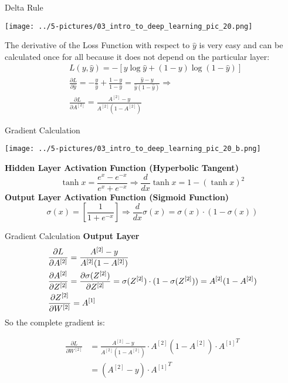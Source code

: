 \documentclass[11pt]{beamer}
\begin{document}
\begin{frame}{Delta Rule}
\begin{center}
\texttt{[image: ../5-pictures/03\_intro\_to\_deep\_learning\_pic\_20.png]} 
\end{center}
The derivative of the Loss Function with respect to $\hat y$ is very easy and can be calculated once for all because it does not depend on the particular layer:
\begin{align*}
&L(y, \hat{y}) = -[y\log{\hat{y}} + (1 - y)\log{(1 - \hat{y})}] \\
&\frac{\partial L}{\partial \hat y} = -\frac{y}{\hat y} + \frac{1-y}{1-\hat y} = \frac{\hat y - y}{\hat y(1 - \hat y)} \Rightarrow \\
&\frac{\partial L}{\partial A^{[2]}} = \frac{A^{[2]} - y}{A^{[2]}(1 - A^{[2]})}
\end{align*}
\end{frame}
\begin{frame}{Gradient Calculation}
\begin{center}
\texttt{[image: ../5-pictures/03\_intro\_to\_deep\_learning\_pic\_20\_b.png]} 
\end{center}
\textbf{Hidden Layer Activation Function (Hyperbolic Tangent)}
\begin{equation}
\tanh x = \frac{{{e^x} -{e^{- x}}}}{{{e^x} + {e^{ -x}}}} 
\Rightarrow 
\frac{d}{{dx}}\tanh x =  1-{\left(\tanh x \right)}^2 
\end{equation}
\textbf{Output Layer Activation Function (Sigmoid Function)} 
\begin{equation}
\sigma(x) =  \left[ \dfrac{1}{1 + e^{-x}} \right]  \Rightarrow
\dfrac{d}{dx} \sigma(x) =  \sigma(x) \cdot (1 - \sigma(x))
\end{equation}
\end{frame}
\begin{frame}{Gradient Calculation}
\textbf{Output Layer}
\begin{align*}
& \frac{\partial L}{\partial A^{[2]}} = \frac{A^{[2]} - y}{A^{[2]}(1 - A^{[2]})} \notag\\
& \frac{\partial A^{[2]}}{\partial Z^{[2]}} = \frac{\partial \sigma(Z^{[2]})}{\partial Z^{[2]}} = \sigma(Z^{[2]}) \cdot (1 - \sigma(Z^{[2]})) 
= A^{[2]} (1 - A^{[2]}) \\
& \frac{\partial Z^{[2]}}{\partial W^{[2]}} = A^{[1]} 
\end{align*}
So the complete gradient is:

\begin{tcolorbox}
\begin{align*}
\frac{\partial L}{\partial W^{[2]}} &=  
\frac{A^{[2]} - y}{A^{[2]}(1 - A^{[2]})} \cdot 
A^{[2]} (1 - A^{[2]}) \cdot {A^{[1]}}^T \\
&= (A^{[2]} - y) \cdot {A^{[1]}}^T
\end{align*}
\end{tcolorbox}

\end{frame}
\end{document}
